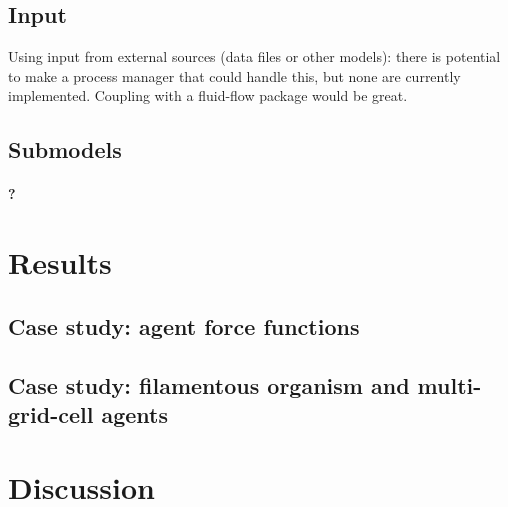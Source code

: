 \documentclass[10pt,letterpaper]{article}
\begin{document}
\subsection*{Input}
Using input from external sources (data files or other models): there is potential to make a process manager that could handle this, but none are currently implemented. Coupling with a fluid-flow package would be great.

\subsection*{Submodels}


\paragraph{?}


\section*{Results}


\subsection*{Case study: agent force functions}

\subsection*{Case study: filamentous organism and multi-grid-cell agents}


\section*{Discussion}
\end{document}
